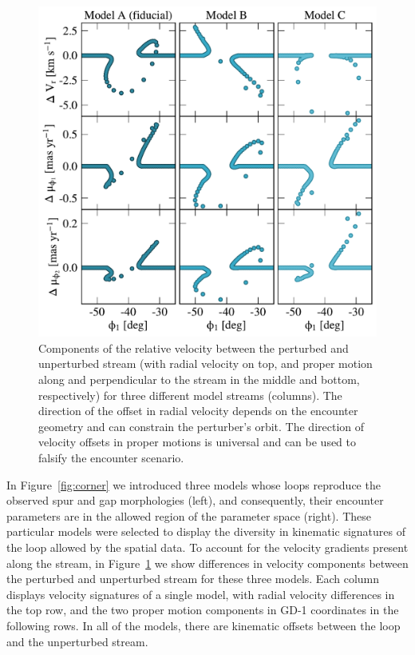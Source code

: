 \documentclass[twocolumn]{aastex62}
\begin{document}
\begin{figure}
\begin{center}
\includegraphics[width=\columnwidth]{kinematic_predictions.pdf}
\end{center}
\caption{Components of the relative velocity between the perturbed and unperturbed stream (with radial velocity on top, and proper motion along and perpendicular to the stream in the middle and bottom, respectively) for three different model streams (columns).
The direction of the offset in radial velocity depends on the encounter geometry and can constrain the perturber's orbit.
The direction of velocity offsets in proper motions is universal and can be used to falsify the encounter scenario.
}
\label{fig:predictions}
\end{figure}

In Figure~\ref{fig:corner} we introduced three models whose loops reproduce the observed spur and gap morphologies (left), and consequently, their encounter parameters are in the allowed region of the parameter space (right).
These particular models were selected to display the diversity in kinematic signatures of the loop allowed by the spatial data.
To account for the velocity gradients present along the stream, in Figure~\ref{fig:predictions} we show differences in velocity components between the perturbed and unperturbed stream for these three models.
Each column displays velocity signatures of a single model, with radial velocity differences in the top row, and the two proper motion components in GD-1 coordinates in the following rows.
In all of the models, there are kinematic offsets between the loop and the unperturbed stream.
\end{document}
